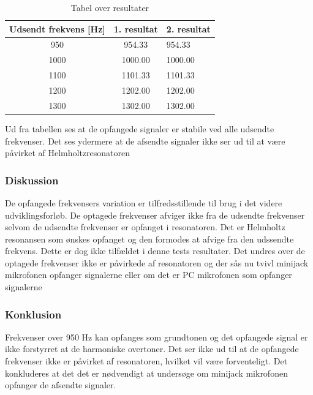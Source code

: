 			\begin{table}[]
				\centering
				\caption{Tabel over resultater}
				\label{bordtest5resultater}
				\begin{tabular}{lll}
					\multicolumn{1}{l|}{\textbf{Udsendt frekvens {[}Hz{]}}} & 	
					\multicolumn{1}{l|}{\textbf{1. resultat}} & \textbf{2. resultat} \\ \hline
					\multicolumn{1}{c|}{950}& 
					\multicolumn{1}{c|}{954.33}&954.33\\
					\multicolumn{1}{c|}{1000}& 
					\multicolumn{1}{c|}{1000.00}&1000.00\\
					\multicolumn{1}{c|}{1100}& 
					\multicolumn{1}{c|}{1101.33}&1101.33\\
					\multicolumn{1}{c|}{1200}& 
					\multicolumn{1}{c|}{1202.00}&1202.00\\
					\multicolumn{1}{c|}{1300}& 
					\multicolumn{1}{c|}{1302.00}&1302.00\\
                   
				\end{tabular}
			\end{table}
			
			Ud fra tabellen ses at de opfangede signaler er stabile ved alle udsendte frekvenser. Det ses ydermere at de afsendte signaler ikke ser ud til at være påvirket af Helmholtzresonatoren
				
			  
			\subsubsection{Diskussion}
			De opfangede frekvensers variation er tilfredsstillende til brug i det videre udviklingsforløb. De optagede frekvenser afviger ikke fra de udsendte frekvenser selvom de udsendte frekvenser er opfanget i resonatoren. Det er Helmholtz resonansen som ønskes opfanget og den formodes at afvige fra den udssendte frekvens. Dette er dog ikke tilfældet i denne tests resultater. Det undres over de optagede frekvenser ikke er påvirkede af resonatoren og der sås nu tvivl minijack mikrofonen opfanger signalerne eller om det er PC mikrofonen som opfanger signalerne
			
			\subsubsection{Konklusion}
			Frekvenser over 950 Hz kan opfanges som grundtonen og det opfangede signal er ikke forstyrret at de harmoniske overtoner. Det ser ikke ud til at de opfangede frekvenser ikke er påvirket af resonatoren, hvilket vil være forventeligt. Det konkluderes at det det er nødvendigt at undersøge om minijack mikrofonen opfanger de afsendte signaler. 
			
